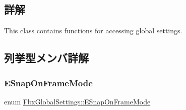 \subsection{詳解}
This class contains functions for accessing global settings. 

\subsection{列挙型メンバ詳解}
\mbox{\label{class_fbx_global_settings_ada0423e32bb00b73cb43b94d54c54b4a}} 
\subsubsection{\texorpdfstring{E\+Snap\+On\+Frame\+Mode}{ESnapOnFrameMode}}
{\footnotesize\ttfamily enum \hyperlink{class_fbx_global_settings_ada0423e32bb00b73cb43b94d54c54b4a}{Fbx\+Global\+Settings\+::\+E\+Snap\+On\+Frame\+Mode}}

